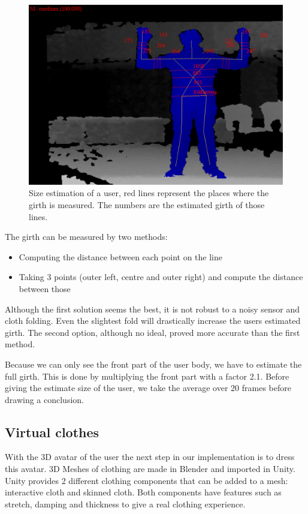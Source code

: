 \documentclass[twocolumn,a4paper]{article}
\begin{document}
\begin{figure}[htp]
\centering
\includegraphics[scale=0.4]{size_estimation.png} 
\caption{Size estimation of a user, red lines represent the places where the girth is measured. The numbers are the estimated girth of those lines.}
\label{fig:size_estimation}
\end{figure}

The girth can be measured by two methods:
\begin{itemize}
\item Computing the distance between each point on the line
\item Taking 3 points (outer left, centre and outer right) and compute the distance between those
\end{itemize}
Although the first solution seems the best, it is not robust to a noisy sensor and cloth folding. Even the slightest fold will drastically increase the users estimated girth.
The second option, although no ideal, proved more accurate than the first method.

Because we can only see the front part of the user body, we have to estimate the full girth. This is done by multiplying the front part with a factor 2.1.
Before giving the estimate size of the user, we take the average over 20 frames before drawing a conclusion.


\subsection{Virtual clothes}
\label{sec:virtual_clothes}
With the 3D avatar of the user the next step in our implementation is to dress this avatar. 3D Meshes of clothing are made in Blender and imported in Unity. Unity provides 2 different clothing components that can be added to a mesh: interactive cloth and skinned cloth. Both components have features such as stretch, damping and thickness to give a real clothing experience.
\end{document}
